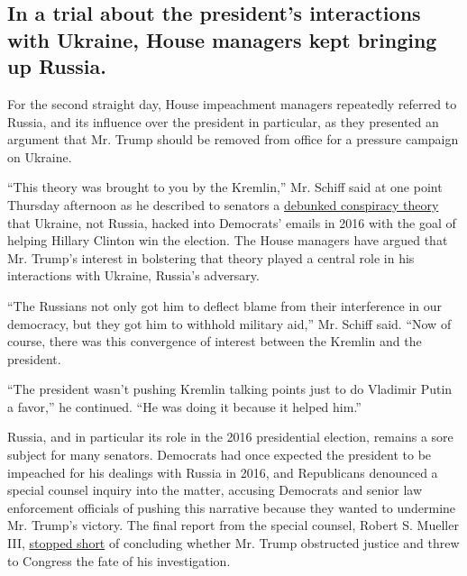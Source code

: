 \hypertarget{in-a-trial-about-the-presidents-interactions-with-ukraine-house-managers-kept-bringing-up-russia}{%
\subsection{In a trial about the president's interactions with Ukraine,
House managers kept bringing up
Russia.}\label{in-a-trial-about-the-presidents-interactions-with-ukraine-house-managers-kept-bringing-up-russia}}

For the second straight day, House impeachment managers repeatedly
referred to Russia, and its influence over the president in particular,
as they presented an argument that Mr. Trump should be removed from
office for a pressure campaign on Ukraine.

``This theory was brought to you by the Kremlin,'' Mr. Schiff said at
one point Thursday afternoon as he described to senators a
\href{https://www.nytimes3xbfgragh.onion/2019/10/03/us/politics/trump-ukraine-conspiracy.html}{debunked
conspiracy theory} that Ukraine, not Russia, hacked into Democrats'
emails in 2016 with the goal of helping Hillary Clinton win the
election. The House managers have argued that Mr. Trump's interest in
bolstering that theory played a central role in his interactions with
Ukraine, Russia's adversary.

``The Russians not only got him to deflect blame from their interference
in our democracy, but they got him to withhold military aid,'' Mr.
Schiff said. ``Now of course, there was this convergence of interest
between the Kremlin and the president.

``The president wasn't pushing Kremlin talking points just to do
Vladimir Putin a favor,'' he continued. ``He was doing it because it
helped him.''

Russia, and in particular its role in the 2016 presidential election,
remains a sore subject for many senators. Democrats had once expected
the president to be impeached for his dealings with Russia in 2016, and
Republicans denounced a special counsel inquiry into the matter,
accusing Democrats and senior law enforcement officials of pushing this
narrative because they wanted to undermine Mr. Trump's victory. The
final report from the special counsel, Robert S. Mueller III,
\href{https://www.nytimes3xbfgragh.onion/2019/04/23/us/politics/trump-mueller-obstruction.html}{stopped
short} of concluding whether Mr. Trump obstructed justice and threw to
Congress the fate of his investigation.

